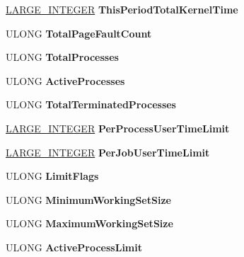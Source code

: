 \begin{DoxyCompactItemize}
\hyperlink{union___l_a_r_g_e___i_n_t_e_g_e_r}{L\+A\+R\+G\+E\+\_\+\+I\+N\+T\+E\+G\+ER} {\bfseries This\+Period\+Total\+Kernel\+Time}
\item 
\mbox{\label{struct___e_j_o_b_a687e0b566d5ee35542e1fbec01a811e6}} 
U\+L\+O\+NG {\bfseries Total\+Page\+Fault\+Count}
\item 
\mbox{\label{struct___e_j_o_b_a22042e5ce221b752fdf910df07732df7}} 
U\+L\+O\+NG {\bfseries Total\+Processes}
\item 
\mbox{\label{struct___e_j_o_b_a4bd93da22ac05a8c81e9ce9768adbd91}} 
U\+L\+O\+NG {\bfseries Active\+Processes}
\item 
\mbox{\label{struct___e_j_o_b_a8400fb4db46f3405ee40d4e0aa4d827b}} 
U\+L\+O\+NG {\bfseries Total\+Terminated\+Processes}
\item 
\mbox{\label{struct___e_j_o_b_afac58cf20a9c091413ed0acf97a8556e}} 
\hyperlink{union___l_a_r_g_e___i_n_t_e_g_e_r}{L\+A\+R\+G\+E\+\_\+\+I\+N\+T\+E\+G\+ER} {\bfseries Per\+Process\+User\+Time\+Limit}
\item 
\mbox{\label{struct___e_j_o_b_a4639b6571b4961753c48dff71f7789a4}} 
\hyperlink{union___l_a_r_g_e___i_n_t_e_g_e_r}{L\+A\+R\+G\+E\+\_\+\+I\+N\+T\+E\+G\+ER} {\bfseries Per\+Job\+User\+Time\+Limit}
\item 
\mbox{\label{struct___e_j_o_b_a15558644e382db90e6620e0d1c6bba55}} 
U\+L\+O\+NG {\bfseries Limit\+Flags}
\item 
\mbox{\label{struct___e_j_o_b_a6eab49c7d4a43dd2d421934ac78301d7}} 
U\+L\+O\+NG {\bfseries Minimum\+Working\+Set\+Size}
\item 
\mbox{\label{struct___e_j_o_b_a8cda8c69e8353db2f045078753b5fc3c}} 
U\+L\+O\+NG {\bfseries Maximum\+Working\+Set\+Size}
\item 
\mbox{\label{struct___e_j_o_b_a257d3be244e6fba3d9ddb4d483268153}} 
U\+L\+O\+NG {\bfseries Active\+Process\+Limit}
\item 
\mbox{\label{struct___e_j_o_b_a48237312fb2d8cc7ec02aaa9f36ba183}} 

\end{DoxyCompactItemize}
